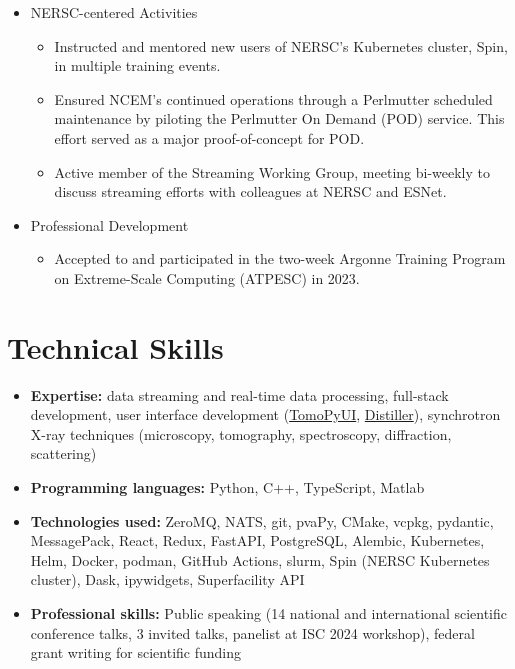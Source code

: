 \documentclass[11pt]{article} %
\begin{document}
\begin{itemize}
  \item NERSC-centered Activities
    \begin{itemize}
      \item Instructed and mentored new users of NERSC's Kubernetes cluster, Spin, in multiple training events.
      \item Ensured NCEM's continued operations through a Perlmutter scheduled maintenance by piloting the Perlmutter On Demand (POD) service. This effort served as a major proof-of-concept for POD.\
      \item Active member of the Streaming Working Group, meeting bi-weekly to discuss streaming efforts with colleagues at NERSC and ESNet.
    \end{itemize}

  \item Professional Development
    \begin{itemize}
      \item Accepted to and participated in the two-week Argonne Training Program on Extreme-Scale Computing (ATPESC) in 2023.
    \end{itemize}
\end{itemize}

\section{Technical Skills}

\begin{itemize}
  \item \textbf{Expertise:} data streaming and real-time data processing, full-stack development, user interface development (\href{https://onlinelibrary.wiley.com/iucr/doi/10.1107/S1600577524003989}{TomoPyUI}, \href{https://github.com/OpenChemistry/distiller}{Distiller}), synchrotron X-ray techniques (microscopy, tomography, spectroscopy, diffraction, scattering)
  \item \textbf{Programming languages:} Python, C++, TypeScript, Matlab
  \item \textbf{Technologies used:} ZeroMQ, NATS, git, pvaPy, CMake, vcpkg, pydantic, MessagePack, React, Redux, FastAPI, PostgreSQL, Alembic, Kubernetes, Helm, Docker, podman, GitHub Actions, slurm, Spin (NERSC Kubernetes cluster), Dask, ipywidgets, Superfacility API
  \item \textbf{Professional skills:} Public speaking (14 national and international scientific conference talks, 3 invited talks, panelist at ISC 2024 workshop), federal grant writing for scientific funding
\end{itemize}
\end{document}
